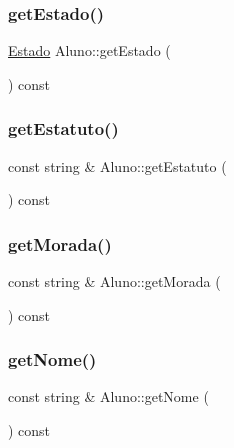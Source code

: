 \hypertarget{class_aluno_a3e853d005e1ed55e130b660b925e604d}{}\label{class_aluno_a3e853d005e1ed55e130b660b925e604d} 
\subsubsection{\texorpdfstring{get\+Estado()}{getEstado()}}
{\footnotesize\ttfamily \hyperlink{aluno_8h_a9d4630b1e0c310d9b8c562abd8114c49}{Estado} Aluno\+::get\+Estado (\begin{DoxyParamCaption}{ }\end{DoxyParamCaption}) const}

\hypertarget{class_aluno_ae9bb3b0f1dd75bad1f860478631232be}{}\label{class_aluno_ae9bb3b0f1dd75bad1f860478631232be} 
\subsubsection{\texorpdfstring{get\+Estatuto()}{getEstatuto()}}
{\footnotesize\ttfamily const string \& Aluno\+::get\+Estatuto (\begin{DoxyParamCaption}{ }\end{DoxyParamCaption}) const}

\hypertarget{class_aluno_a7c0acf4e931f989aa8bb5d707b6cf7c5}{}\label{class_aluno_a7c0acf4e931f989aa8bb5d707b6cf7c5} 
\subsubsection{\texorpdfstring{get\+Morada()}{getMorada()}}
{\footnotesize\ttfamily const string \& Aluno\+::get\+Morada (\begin{DoxyParamCaption}{ }\end{DoxyParamCaption}) const}

\hypertarget{class_aluno_a3070c2f9d3933ce8fe336b1fa53ca7b7}{}\label{class_aluno_a3070c2f9d3933ce8fe336b1fa53ca7b7} 
\subsubsection{\texorpdfstring{get\+Nome()}{getNome()}}
{\footnotesize\ttfamily const string \& Aluno\+::get\+Nome (\begin{DoxyParamCaption}{ }\end{DoxyParamCaption}) const}

